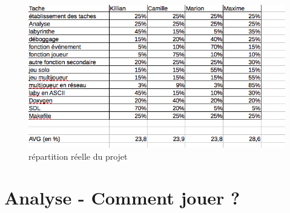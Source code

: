 \documentclass[12pt,a4paper,twoside]{article}
\begin{document}
\begin {figure}[h]
\includegraphics[width=1.1\textwidth]{IMG/pourc.png}
\caption{\label {ref4}répartition réelle du projet}
\end {figure}
\newpage
\section{Analyse - Comment jouer ?}
\end{document}
